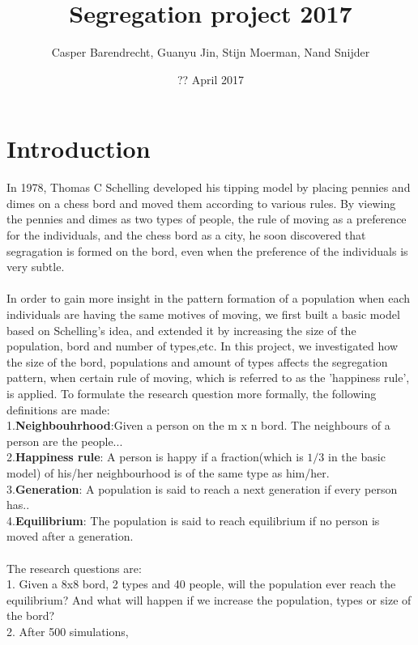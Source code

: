 \documentclass{article}
\title{Segregation project 2017}
\author{Casper Barendrecht, Guanyu Jin, Stijn Moerman, Nand Snijder}
\date{?? April 2017}
\begin{document}
\maketitle
\section{Introduction}
In 1978, Thomas C Schelling developed his tipping model by placing pennies and dimes on a chess bord and moved them according to various rules. By viewing the pennies and dimes as two types of people, the rule of moving as a preference for the individuals, and the chess bord as a city, he soon discovered that segragation is formed on the bord, even when the preference of the individuals is very subtle.\\
\\
In order to gain more insight in the pattern formation of a population when each individuals are having the same motives of moving, we first built a basic model based on Schelling's idea, and extended it by increasing the size of the population, bord and number of types,etc. In this project, we investigated how the size of the bord, populations and amount of types affects the segregation pattern, when certain rule of moving, which is referred to as the 'happiness rule', is applied. To formulate the research question more formally, the following definitions are made:\\
1.\textbf{Neighbouhrhood}:Given a person on the m x n bord. The neighbours of a person are the people... \\
2.\textbf{Happiness rule}: A person is happy if a fraction(which is $1/3$ in the basic model) of his/her neighbourhood is of the same type as him/her.\\
3.\textbf{Generation}: A population is said to reach a next generation if every person has.. \\
4.\textbf{Equilibrium}: The population is said to reach equilibrium if no person is moved after a generation.\\
\\
The research questions are:\\
1. Given a 8x8 bord, 2 types and 40 people, will the population ever reach the equilibrium? And what will happen if we increase the population, types or size of the bord?\\
2. After 500 simulations, 
\end{document}
